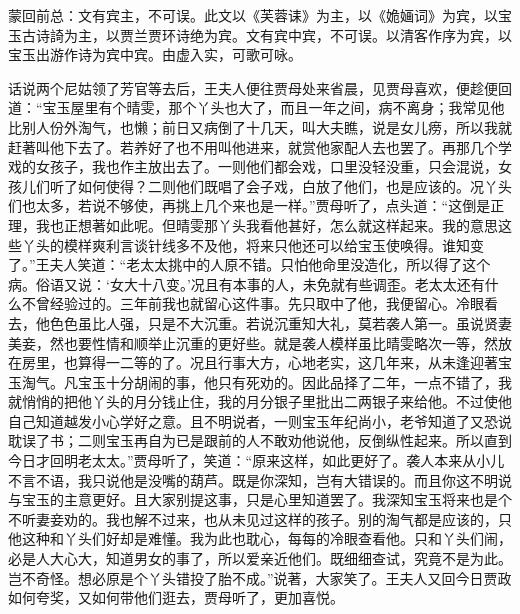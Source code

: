 \begin{parag}
    \begin{note}蒙回前总：文有宾主，不可误。此文以《芙蓉诔》为主，以《姽婳词》为宾，以宝玉古诗䛴为主，以贾兰贾环诗绝为宾。文有宾中宾，不可误。以清客作序为宾，以宝玉出游作诗为宾中宾。由虚入实，可歌可咏。\end{note}
\end{parag}


\begin{parag}
    话说两个尼姑领了芳官等去后，王夫人便往贾母处来省晨，见贾母喜欢，便趁便回道：“宝玉屋里有个晴雯，那个丫头也大了，而且一年之间，病不离身；我常见他比别人份外淘气，也懒；前日又病倒了十几天，叫大夫瞧，说是女儿痨，所以我就赶著叫他下去了。若养好了也不用叫他进来，就赏他家配人去也罢了。再那几个学戏的女孩子，我也作主放出去了。一则他们都会戏，口里没轻没重，只会混说，女孩儿们听了如何使得？二则他们既唱了会子戏，白放了他们，也是应该的。况丫头们也太多，若说不够使，再挑上几个来也是一样。”贾母听了，点头道：“这倒是正理，我也正想著如此呢。但晴雯那丫头我看他甚好，怎么就这样起来。我的意思这些丫头的模样爽利言谈针线多不及他，将来只他还可以给宝玉使唤得。谁知变了。”王夫人笑道：“老太太挑中的人原不错。只怕他命里没造化，所以得了这个病。俗语又说：‘女大十八变。’况且有本事的人，未免就有些调歪。老太太还有什么不曾经验过的。三年前我也就留心这件事。先只取中了他，我便留心。冷眼看去，他色色虽比人强，只是不大沉重。若说沉重知大礼，莫若袭人第一。虽说贤妻美妾，然也要性情和顺举止沉重的更好些。就是袭人模样虽比晴雯略次一等，然放在房里，也算得一二等的了。况且行事大方，心地老实，这几年来，从未逢迎著宝玉淘气。凡宝玉十分胡闹的事，他只有死劝的。因此品择了二年，一点不错了，我就悄悄的把他丫头的月分钱止住，我的月分银子里批出二两银子来给他。不过使他自己知道越发小心学好之意。且不明说者，一则宝玉年纪尚小，老爷知道了又恐说耽误了书；二则宝玉再自为已是跟前的人不敢劝他说他，反倒纵性起来。所以直到今日才回明老太太。”贾母听了，笑道：“原来这样，如此更好了。袭人本来从小儿不言不语，我只说他是没嘴的葫芦。既是你深知，岂有大错误的。而且你这不明说与宝玉的主意更好。且大家别提这事，只是心里知道罢了。我深知宝玉将来也是个不听妻妾劝的。我也解不过来，也从未见过这样的孩子。别的淘气都是应该的，只他这种和丫头们好却是难懂。我为此也耽心，每每的冷眼查看他。只和丫头们闹，必是人大心大，知道男女的事了，所以爱亲近他们。既细细查试，究竟不是为此。岂不奇怪。想必原是个丫头错投了胎不成。”说著，大家笑了。王夫人又回今日贾政如何夸奖，又如何带他们逛去，贾母听了，更加喜悦。
\end{parag}


